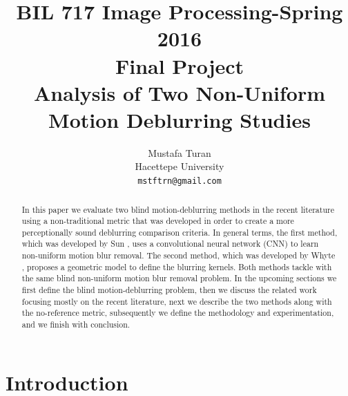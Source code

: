 \documentclass[10pt,twocolumn,letterpaper]{article}
\begin{document}
\title{BIL 717 Image Processing-Spring 2016\\
Final Project\\
Analysis of Two Non-Uniform\\
Motion Deblurring Studies}

\author{Mustafa Turan\\
Hacettepe University\\
{\tt\small mstftrn@gmail.com}}


\maketitle

\begin{abstract}
In this paper we evaluate two blind motion-deblurring methods in the recent literature using a non-traditional metric that was developed in order to create a more perceptionally sound deblurring comparison criteria. In general terms, the first method, which was developed by Sun \etal \cite{sun2015learning}, uses a convolutional neural network (CNN) to learn non-uniform motion blur removal. The second method, which was developed by Whyte \etal \cite{whyte2012non}, proposes a geometric model to define the blurring kernels. Both methods tackle with the same blind non-uniform motion blur removal problem. In the upcoming sections we first define the blind motion-deblurring problem, then we discuss the related work focusing mostly on the recent literature, next we describe the two methods along with the no-reference metric, subsequently we define the methodology and experimentation, and we finish with conclusion.
\end{abstract}

\section{Introduction}
\end{document}
